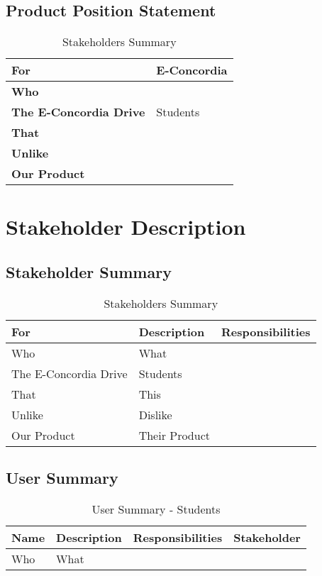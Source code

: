 \documentclass{article}
\begin{document}
\subsection{Product Position Statement}

\begin{table}[h!]
\begin{tabular}{|p{4.5cm}|p{11.5cm}|}
\hline
\textbf{For} & E-Concordia \\ \hline
\textbf{Who}& \\ \hline
\textbf{The E-Concordia Drive} & Students\\ \hline
\textbf{That} & \\ \hline
\textbf{Unlike} & \\ \hline
\textbf{Our Product} & \\ \hline
\end{tabular}
\caption{Stakeholders Summary}
\label{table:2}
\end{table}

\section{Stakeholder Description}

\subsection{Stakeholder Summary}

\begin{table}[h!]
\begin{tabular}{|p{4.5cm}|p{4.5cm}|p{6.5cm}|}
\hline
\textbf{For} & \textbf{Description} & \textbf{Responsibilities} \\ \hline
Who & What & \\ \hline
The E-Concordia Drive & Students &\\ \hline
That & This &\\ \hline
Unlike & Dislike &\\ \hline
Our Product & Their Product &\\ \hline
\end{tabular}
\caption{Stakeholders Summary}
\label{table:3}
\end{table}

\subsection{User Summary}

\begin{table}[h!]
\begin{tabular}{|p{3.5cm}|p{3.5cm}|p{4.5cm}|p{4cm}|}
\hline
\textbf{Name} & \textbf{Description} & \textbf{Responsibilities} & \textbf{Stakeholder}\\ \hline
Who & What & & \\ \hline
\end{tabular}
\caption{User Summary - Students}
\label{table:4}
\end{table}
\end{document}
